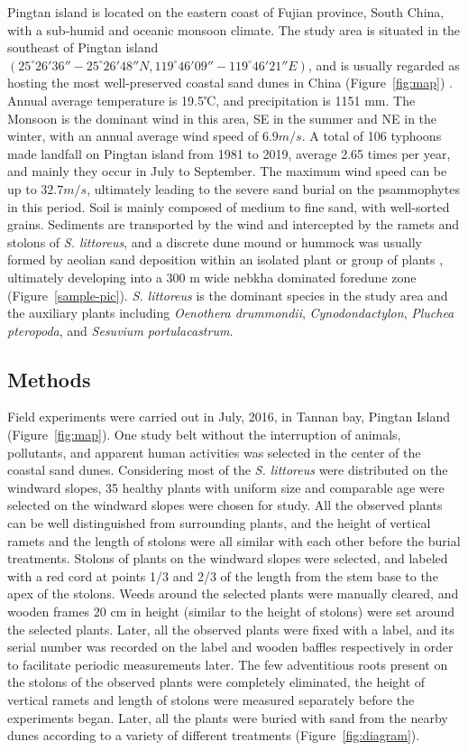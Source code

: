 \documentclass[]{interact}
\theoremstyle{plain}%
\theoremstyle{definition}
\theoremstyle{remark}
\begin{document}
Pingtan island is located on the eastern coast of Fujian province, South China, with a sub-humid and oceanic monsoon climate. The study area is situated in the southeast of Pingtan island $(25^{\circ}26'36''-25^{\circ}26'48''N, 119^{\circ}46'09''-119^{\circ}46'21''E)$, and is usually regarded as hosting the most well-preserved coastal sand dunes in China (Figure~\ref{fig:map}) 
\citep{xian-jiDiurnalVariationCharacteristics2017}. 
Annual average temperature is 19.5℃, and precipitation is 1151 mm. The Monsoon is the dominant wind in this area, SE in the summer and NE in the winter, with an annual average wind speed of $6.9 m/s$. A total of 106 typhoons made landfall on Pingtan island from 1981 to 2019, average 2.65 times per year, and mainly they occur in July to September. The maximum wind speed can be up to $32.7 m/s$, ultimately leading to the severe sand burial on the psammophytes in this period. Soil is mainly composed of medium to fine sand, with well-sorted grains. Sediments are transported by the wind and intercepted by the ramets and stolons of \textit{S. littoreus}, and a discrete dune mound or hummock was usually formed by aeolian sand deposition within an isolated plant or group of plants \citep{hespCFDFlowDynamics2019}, ultimately developing into a 300 m wide nebkha dominated foredune zone (Figure~\ref{sample-pic}). \textit{S. littoreus} is the dominant species in the study area and the auxiliary plants including \textit{Oenothera drummondii}, \textit{Cynodondactylon}, \textit{Pluchea pteropoda}, and \textit{Sesuvium portulacastrum}. 



\subsection{Methods}
Field experiments were carried out in July, 2016, in Tannan bay, Pingtan Island (Figure~\ref{fig:map}). One study belt without the interruption of animals, pollutants, and apparent human activities was selected in the center of the coastal sand dunes. Considering most of the \textit{S. littoreus} were distributed on the windward slopes, 35 healthy plants with uniform size and comparable age were selected on the windward slopes were chosen for study. All the observed plants can be well distinguished from surrounding plants, and the height of vertical ramets and the length of stolons were all similar with each other before the burial treatments. Stolons of plants on the windward slopes were selected, and labeled with a red cord at points 1/3 and 2/3 of the length from the stem base to the apex of the stolons. Weeds around the selected plants were manually cleared, and wooden frames 20 cm in height (similar to the height of stolons) were set around the selected plants. Later, all the observed plants were fixed with a label, and its serial number was recorded on the label and wooden baffles respectively in order to facilitate periodic measurements later. The few adventitious roots present on the stolons of the observed plants were completely eliminated, the height of vertical ramets and length of stolons were measured separately before the experiments began. Later, all the plants were buried with sand from the nearby dunes according to a variety of different treatments (Figure~\ref{fig:diagram}). 
\end{document}
